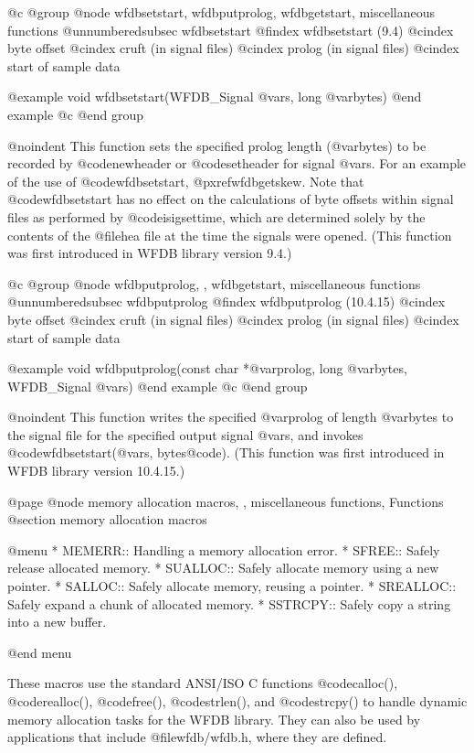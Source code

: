 {{{{{{{{{@c @group
@node     wfdbsetstart, wfdbputprolog, wfdbgetstart, miscellaneous functions
@unnumberedsubsec wfdbsetstart
@findex wfdbsetstart (9.4)
@cindex byte offset
@cindex cruft (in signal files)
@cindex prolog (in signal files)
@cindex start of sample data

@example
void wfdbsetstart(WFDB_Signal @var{s}, long @var{bytes})
@end example
@c @end group

@noindent
This function sets the specified prolog length (@var{bytes}) to be
recorded by @code{newheader} or @code{setheader} for signal @var{s}.
For an example of the use of @code{wfdbsetstart}, @pxref{wfdbgetskew}.  Note
that @code{wfdbsetstart} has no effect on the calculations of byte offsets
within signal files as performed by @code{isigsettime}, which are
determined solely by the contents of the @file{hea} file at the time
the signals were opened.  (This function was first introduced in WFDB library
version 9.4.)

@c @group
@node     wfdbputprolog, , wfdbgetstart, miscellaneous functions
@unnumberedsubsec wfdbputprolog
@findex wfdbputprolog (10.4.15)
@cindex byte offset
@cindex cruft (in signal files)
@cindex prolog (in signal files)
@cindex start of sample data

@example
void wfdbputprolog(const char *@var{prolog}, long @var{bytes},
                   WFDB_Signal @var{s})
@end example
@c @end group

@noindent
This function writes the specified @var{prolog} of length @var{bytes} to the
signal file for the specified output signal @var{s}, and invokes
@code{wfdbsetstart(}@var{s, bytes}@code{)}.  (This function was first
introduced in WFDB library version 10.4.15.)

@page
@node memory allocation macros, , miscellaneous functions, Functions
@section memory allocation macros

@menu
* MEMERR::                      Handling a memory allocation error.
* SFREE::                       Safely release allocated memory.
* SUALLOC::                     Safely allocate memory using a new pointer.
* SALLOC::                      Safely allocate memory, reusing a pointer.
* SREALLOC::                    Safely expand a chunk of allocated memory.
* SSTRCPY::                     Safely copy a string into a new buffer.

@end menu

These macros use the standard ANSI/ISO C functions @code{calloc()},
@code{realloc()}, @code{free()}, @code{strlen()}, and @code{strcpy()} to handle
dynamic memory allocation tasks for the WFDB library.  They can also be used by
applications that include @file{wfdb/wfdb.h}, where they are defined.

}}}}}}}}}
